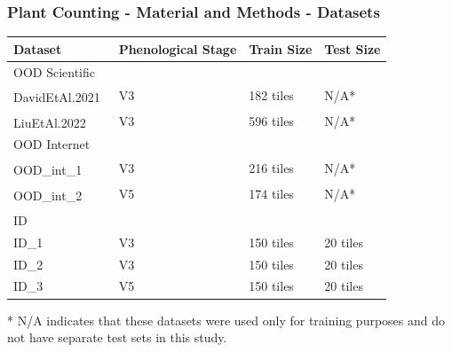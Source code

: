 \documentclass[aspectratio=43]{beamer}
\renewcommand{\thefootnote}{\arabic{footnote}}
\newcommand{\citeDavid}{David et al. Plant detection and counting from high-resolution RGB images acquired from UAVs. \textit{bioRxiv}, 2021}
\newcommand{\citeLiu}{Liu et al. IntegrateNet: A deep learning network for maize stand counting from UAV imagery. \textit{IEEE Geosci. Remote Sens. Lett.}, 19:6512605, 2022}
\newcommand{\citeMaizeSeeding}{Maize\_seeding dataset. \url{https://universe.roboflow.com/objectdetection-hytat/maize\_seeding}}
\newcommand{\citeMaizeSeedling}{Maize-seedling-detection dataset. \url{https://universe.roboflow.com/fyxdds-icloud-com/maize-seedling-detection}}
\newcommand{\citeBumbacaDataset}{Bumbaca, Samuele. ‘The Original Dataset for the Paper "on the Minimum Data Set Requirements for Fine-tuning an Object Detector for Arable Crop Plant Counting: A Case Study on Maize Seedlings"’. Zenodo, 17 April 2025. https://doi.org/10.5281/zenodo.15235602.}
\newcommand{\fcite}[1]{%
  \stepcounter{footnote}%
  \textsuperscript{\thefootnote}%
  \footnotetext[\value{footnote}]{#1}%
}
\begin{document}
\begin{frame}
    \scriptsize
    \frametitle{Plant Counting - Material and Methods - Datasets}
    \begin{table}[H]
        \begin{tabularx}{\textwidth}{llXX}
        \toprule
        \textbf{Dataset} & \textbf{Phenological Stage} & \textbf{Train Size} & \textbf{Test Size} \\
        \midrule
        \multicolumn{4}{l}{OOD Scientific} \\
        \hspace{0.5em}DavidEtAl.2021~\fcite{\citeDavid} & V3 & 182 tiles & N/A* \\
        \hspace{0.5em}LiuEtAl.2022~\fcite{\citeLiu} & V3 & 596 tiles & N/A* \\
        \midrule
        \multicolumn{4}{l}{OOD Internet} \\
        \hspace{0.5em}OOD\_int\_1~\fcite{\citeMaizeSeeding} & V3 & 216 tiles & N/A* \\
        \hspace{0.5em}OOD\_int\_2~\fcite{\citeMaizeSeedling} & V5 & 174 tiles & N/A* \\
        \midrule
        \multicolumn{4}{l}{ID~\fcite{\citeBumbacaDataset}} \\
        \hspace{0.5em}ID\_1 & V3 & 150 tiles & 20 tiles \\
        \hspace{0.5em}ID\_2 & V3 & 150 tiles & 20 tiles \\
        \hspace{0.5em}ID\_3 & V5 & 150 tiles & 20 tiles \\
        \bottomrule
        \end{tabularx}
        \noindent\footnotesize{* N/A indicates that these datasets were used only for training purposes and do not have separate test sets in this study.}
    \end{table}
\end{frame}
\end{document}
